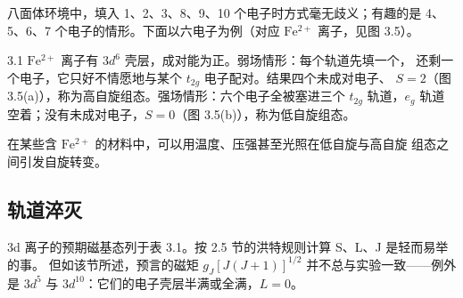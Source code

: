 八面体环境中，填入 1、2、3、8、9、10 个电子时方式毫无歧义；有趣的是 4、5、6、7
个电子的情形。下面以六电子为例（对应 $\mathrm{Fe^{2+}}$ 离子，见图 3.5）。

\begin{example}{3.1}
$\mathrm{Fe^{2+}}$ 离子有 $3d^{6}$ 壳层，成对能为正。弱场情形：每个轨道先填一个，
还剩一个电子，它只好不情愿地与某个 $t_{2g}$ 电子配对。结果四个未成对电子、
$S=2$（图 3.5(a)），称为高自旋组态。强场情形：六个电子全被塞进三个 $t_{2g}$
轨道，$e_g$ 轨道空着；没有未成对电子，$S=0$（图 3.5(b)），称为低自旋组态。
\end{example}

在某些含 $\mathrm{Fe^{2+}}$ 的材料中，可以用温度、压强甚至光照在低自旋与高自旋
组态之间引发自旋转变。

\subsection{轨道淬灭}

3d 离子的预期磁基态列于表 3.1。按 2.5 节的洪特规则计算 S、L、J 是轻而易举的事。
但如该节所述，预言的磁矩 $g_J[J(J+1)]^{1/2}$ 并不总与实验一致——例外是 $3d^{5}$
与 $3d^{10}$：它们的电子壳层半满或全满，$L=0$。

